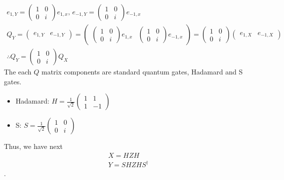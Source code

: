 \begin{align}
    e_{1, Y}  = \begin{pmatrix}
        1 & 0 \\
        0 & i
    \end{pmatrix} e_{1, x}, \,
    e_{-1, Y}  = \begin{pmatrix}
        1 & 0 \\
        0 & i
    \end{pmatrix} e_{-1, x} \\
    Q_Y = \begin{pmatrix}
        e_{1, Y} & e_{-1, Y}
    \end{pmatrix} = 
    \begin{pmatrix}
        \begin{pmatrix}
            1 & 0 \\
            0 & i
        \end{pmatrix} e_{1, x} &
        \begin{pmatrix}
            1 & 0 \\
            0 & i
        \end{pmatrix} e_{-1, x}
    \end{pmatrix} = 
    \begin{pmatrix}
        1 & 0 \\
        0 & i
    \end{pmatrix} 
    \begin{pmatrix}
        e_{1, X} & e_{-1, X}
    \end{pmatrix} \\
    \therefore Q_Y = \begin{pmatrix}
        1 & 0 \\
        0 & i
    \end{pmatrix}  Q_X
\end{align}
The each $Q$ matrix components are standard quantum gates, Hadamard and S gates.
\begin{itemize}
    \item Hadamard: $H = \frac{1}{\sqrt{2}}\begin{pmatrix}
        1 & 1 \\
        1 & -1
    \end{pmatrix}$
    \item S: $S = \frac{1}{\sqrt{2}}\begin{pmatrix}
        1 & 0 \\
        0 & i
    \end{pmatrix}$
\end{itemize}
Thus, we have next
\begin{align}
    X = H Z H \\
    Y = S H Z H S^\dagger
\end{align}.

